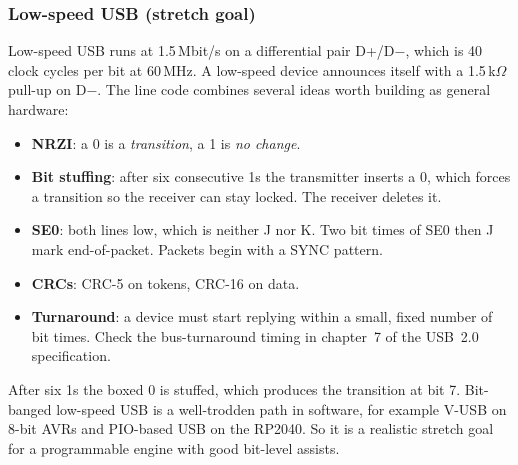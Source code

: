 \subsubsection{Low-speed USB (stretch goal)}
Low-speed USB runs at 1.5\,Mbit/s on a differential pair D+/D$-$, which is
40 clock cycles per bit at 60\,MHz. A low-speed device announces itself with a
1.5\,k$\Omega$ pull-up on D$-$. The line code combines several ideas worth
building as general hardware:
\begin{itemize}
  \item \textbf{NRZI}: a 0 is a \emph{transition}, a 1 is \emph{no change}.
  \item \textbf{Bit stuffing}: after six consecutive 1s the transmitter
    inserts a 0, which forces a transition so the receiver can stay locked.
    The receiver deletes it.
  \item \textbf{SE0}: both lines low, which is neither J nor K. Two bit times
    of SE0 then J mark end-of-packet. Packets begin with a SYNC pattern.
  \item \textbf{CRCs}: CRC-5 on tokens, CRC-16 on data.
  \item \textbf{Turnaround}: a device must start replying within a small,
    fixed number of bit times. Check the bus-turnaround timing in chapter~7
    of the USB~2.0 specification.
\end{itemize}
\begin{center}
\end{center}
After six 1s the boxed 0 is stuffed, which produces the transition at bit 7.
Bit-banged low-speed USB is a well-trodden path in software, for example
V-USB on 8-bit AVRs and PIO-based USB on the RP2040. So it is a realistic
stretch goal for a programmable engine with good bit-level assists.

